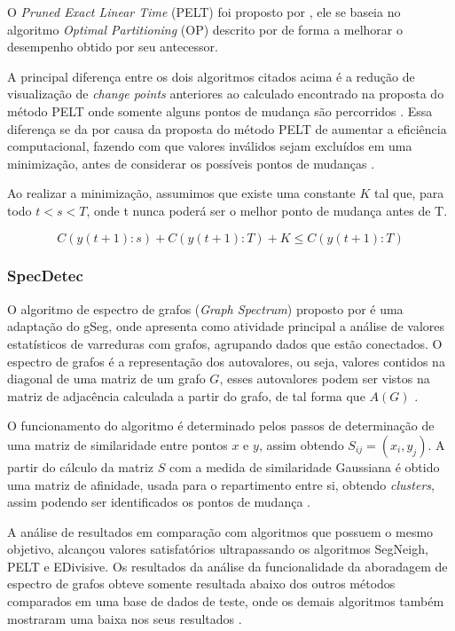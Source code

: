 O \textit{Pruned Exact Linear Time} (PELT) foi proposto por \cite{Killick2012}, ele se baseia no algoritmo \textit{Optimal Partitioning} (OP) descrito por \cite{Gioumousis2005} de forma a melhorar o desempenho obtido por seu antecessor.

A principal diferença entre os dois algoritmos citados acima é a redução de visualização de \textit{change points} anteriores ao calculado encontrado na proposta do método PELT onde somente alguns pontos de mudança são percorridos \cite{BenedicteBakka2018}. Essa diferença se da por causa da proposta do método PELT de aumentar a eficiência computacional, fazendo com que valores inválidos sejam excluídos em uma minimização, antes de considerar os possíveis pontos de mudanças \cite{Killick2012}.

Ao realizar a minimização, assumimos que existe uma constante $K$ tal que, para todo $t < s < T$, onde t nunca poderá ser o melhor ponto de mudança antes de T.

\begin{equation}
    C\left ( y\left ( t+1 \right ):s \right ) + C\left ( y\left ( t+1 \right ):T \right ) + K \leq C\left ( y\left ( t+1 \right ):T \right )
    \label{eq:calculo-pelt}
\end{equation}


\subsubsection{SpecDetec}

O algoritmo de espectro de grafos (\textit{Graph Spectrum}) proposto por \cite{Uzai2019} é uma adaptação do gSeg, onde apresenta como atividade principal a análise de valores estatísticos de varreduras com grafos, agrupando dados que estão conectados. O espectro de grafos é a representação dos autovalores, ou seja, valores contidos na diagonal de uma matriz de um grafo $G$, esses autovalores podem ser vistos na matriz de adjacência calculada a partir do grafo, de tal forma que $A(G)$ \cite{Uzai2019}.

O funcionamento do algoritmo é determinado pelos passos de determinação de uma matriz de similaridade entre pontos $x$ e $y$, assim obtendo $S_{ij} = (x_{i}, y_{j})$. A partir do cálculo da matriz $S$ com a medida de similaridade Gaussiana é obtido uma matriz de afinidade, usada para o repartimento entre si, obtendo \textit{clusters}, assim podendo ser identificados os pontos de mudança \cite{Uzai2019}.

A análise de resultados em comparação com algoritmos que possuem o mesmo objetivo, alcançou valores satisfatórios ultrapassando os algoritmos SegNeigh, PELT e EDivisive. Os resultados da análise da funcionalidade da aboradagem de espectro de grafos obteve somente resultada abaixo dos outros métodos comparados em uma base de dados de teste, onde os demais algoritmos também mostraram uma baixa nos seus resultados \cite{Uzai2019}.

